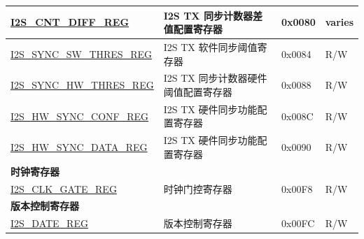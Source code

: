 \begin{longtable}{ | p{5.5cm} | p{7cm} | p{1.3cm} | p{2cm} | }
\hyperref[regdesc:I2SCNTDIFFREG]{I2S\_CNT\_DIFF\_REG} & I2S TX 同步计数器差值配置寄存器 & 0x0080 & varies \\ \hline
\hyperref[regdesc:I2SSYNCSWTHRESREG]{I2S\_SYNC\_SW\_THRES\_REG} & I2S TX 软件同步阈值寄存器 & 0x0084 & R/W \\ \hline
\hyperref[regdesc:I2SSYNCHWTHRESREG]{I2S\_SYNC\_HW\_THRES\_REG} & I2S TX 同步计数器硬件阈值配置寄存器 & 0x0088 & R/W \\ \hline
\hyperref[regdesc:I2SHWSYNCCONFREG]{I2S\_HW\_SYNC\_CONF\_REG} & I2S TX 硬件同步功能配置寄存器 & 0x008C & R/W \\ \hline
\hyperref[regdesc:I2SHWSYNCDATAREG]{I2S\_HW\_SYNC\_DATA\_REG} & I2S TX 硬件同步功能配置寄存器 & 0x0090 & R/W \\ \hline
\multicolumn{4}{|l|}{\textbf{时钟寄存器}} \\ \hline
\hyperref[regdesc:I2SCLKGATEREG]{I2S\_CLK\_GATE\_REG} & 时钟门控寄存器 & 0x00F8 & R/W \\ \hline
\multicolumn{4}{|l|}{\textbf{版本控制寄存器}} \\ \hline
\hyperref[regdesc:I2SDATEREG]{I2S\_DATE\_REG} & 版本控制寄存器 & 0x00FC & R/W \\ \hline
\end{longtable}
